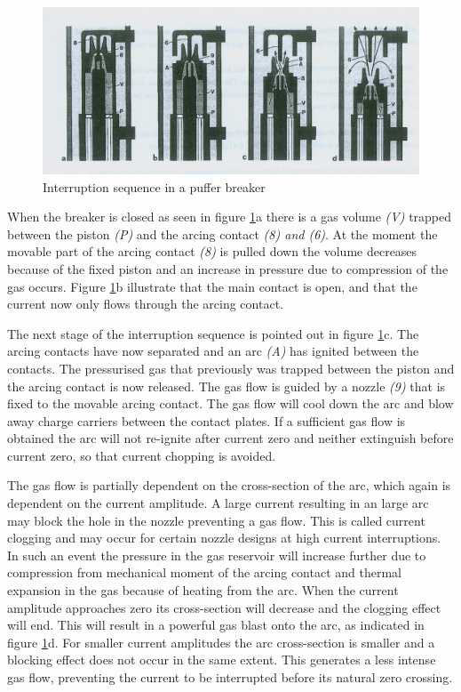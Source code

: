 \documentclass[10pt,a4paper]{article}
\begin{document}
\begin{figure} [H]
\centering
\includegraphics[scale=0.8]{Bilder/Theory/CircutBreakPuff1.png}
\caption{Interruption sequence in a puffer breaker \cite{bib:HVEbreak}} \label{fig:CircutBreakPuff1}
\end{figure}

When the breaker is closed as seen in figure \ref{fig:CircutBreakPuff1}a there is a gas volume \textit{(V)} trapped between the piston \textit{(P)} and the arcing contact \textit{(8) and (6)}. At the moment the movable part of the arcing contact \textit{(8)} is pulled down the volume decreases because of the fixed piston and an increase in pressure due to compression of the gas occurs. Figure \ref{fig:CircutBreakPuff1}b illustrate that the main contact is open, and that the current now only flows through the arcing contact.

The next stage of the interruption sequence is pointed out in figure \ref{fig:CircutBreakPuff1}c. The arcing contacts have now separated and an arc \textit{(A)} has ignited between the contacts. The pressurised gas that previously was trapped between the piston and the arcing contact is now released. The gas flow is guided by a nozzle \textit{(9)} that is fixed to the movable arcing contact. The gas flow will cool down the arc and blow away charge carriers between the contact plates. If a sufficient gas flow is obtained the arc will not re-ignite after current zero and neither extinguish before current zero, so that current chopping is avoided.

The gas flow is partially dependent on the cross-section of the arc, which again is dependent on the current amplitude. A large current resulting in an large arc may block the hole in the nozzle preventing a gas flow. This is called current clogging and may occur for certain nozzle designs at high current interruptions. In such an event the pressure in the gas reservoir will increase further due to compression from mechanical moment of the arcing contact and thermal expansion in the gas because of heating from the arc. When the current amplitude approaches zero its cross-section will decrease and the clogging effect will end. This will result in a powerful gas blast onto the arc, as indicated in figure \ref{fig:CircutBreakPuff1}d. For smaller current amplitudes the arc cross-section is smaller and a blocking effect does not occur in the same extent. This generates a less intense gas flow, preventing the current to be interrupted before its natural zero crossing.
 
\end{document}
